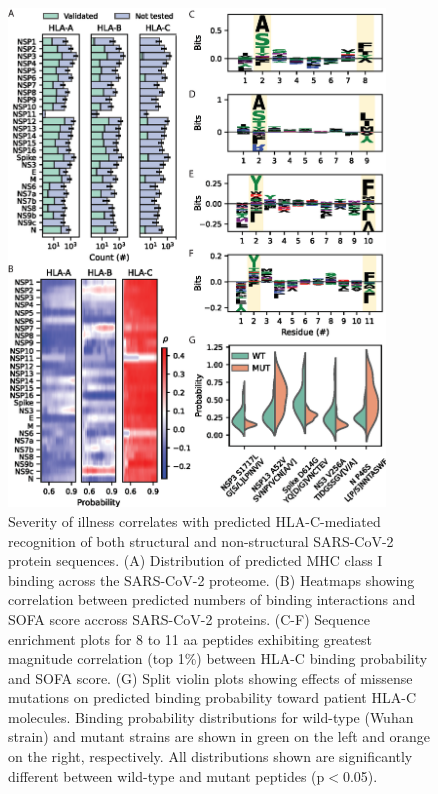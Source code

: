 \documentclass[utf8]{frontiersinFPHY_FAMS} %
\begin{document}
\begin{figure}[h!]
\begin{center}
\includegraphics[width=10cm]{Figure2}%
\end{center}
\caption{Severity of illness correlates with predicted HLA-C-mediated recognition of both structural and non-structural SARS-CoV-2 protein sequences. (A) Distribution of predicted MHC class I binding across the SARS-CoV-2 proteome. (B) Heatmaps showing correlation between predicted numbers of binding interactions and SOFA score accross SARS-CoV-2 proteins. (C-F) Sequence enrichment plots for 8 to 11 aa peptides exhibiting greatest magnitude correlation (top 1\%) between HLA-C binding probability and SOFA score. (G) Split violin plots showing effects of missense mutations on predicted binding probability toward patient HLA-C molecules. Binding probability distributions for wild-type (Wuhan strain) and mutant strains are shown in green on the left and orange on the right, respectively. All distributions shown are significantly different between wild-type and mutant peptides (p$<$0.05).}\label{fig:2}
\end{figure}
\end{document}
